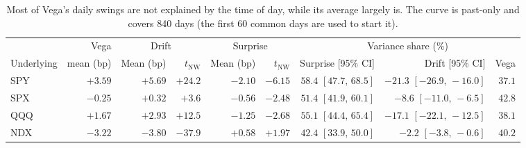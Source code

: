 \begin{table}[tbp]
\centering
\footnotesize
\setlength{\tabcolsep}{3pt}
\begin{tabular}{lrrrrrrrr}
\toprule
 & Vega & \multicolumn{2}{c}{Drift} & \multicolumn{2}{c}{Surprise} & \multicolumn{3}{c}{Variance share (\%)} \\
\cmidrule(lr){3-4}\cmidrule(lr){5-6}\cmidrule(lr){7-9}
Underlying & mean (bp) & Mean (bp) & $t_{\mathrm{NW}}$ & Mean (bp) & $t_{\mathrm{NW}}$ & Surprise [95\% CI] & Drift [95\% CI] & Vega \\
\midrule
SPY & $+3.59$ & $+5.69$ & $+24.2$ & $-2.10$ & $-6.15$ & $58.4$ $[47.7,\,68.5]$ & $-21.3$ $[-26.9,\,-16.0]$ & $37.1$ \\
SPX & $-0.25$ & $+0.32$ & $+3.6$ & $-0.56$ & $-2.48$ & $51.4$ $[41.9,\,60.1]$ & $-8.6$ $[-11.0,\,-6.5]$ & $42.8$ \\
QQQ & $+1.67$ & $+2.93$ & $+12.5$ & $-1.25$ & $-2.68$ & $55.1$ $[44.4,\,65.4]$ & $-17.1$ $[-22.1,\,-12.5]$ & $38.1$ \\
NDX & $-3.22$ & $-3.80$ & $-37.9$ & $+0.58$ & $+1.97$ & $42.4$ $[33.9,\,50.0]$ & $-2.2$ $[-3.8,\,-0.6]$ & $40.2$ \\
\bottomrule
\end{tabular}
\caption{Most of Vega's daily swings are not explained by the time of day, while its average largely is. The curve is past-only and covers 840 days (the first 60 common days are used to start it).}
\label{tab:vegasplit}
\end{table}
